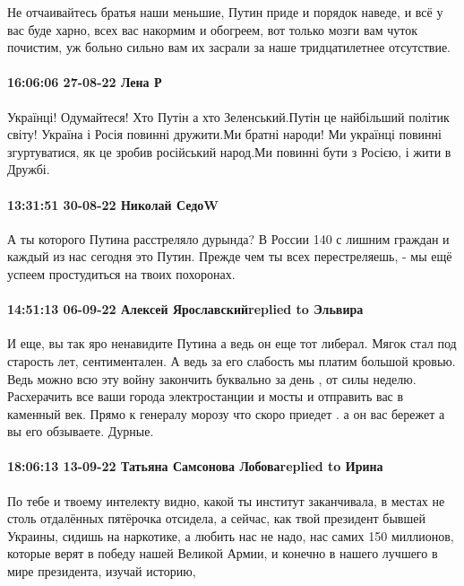 Не отчаивайтесь братья наши меньшие, Путин приде и порядок наведе, и всё у вас
буде харно, всех вас накормим и обогреем, вот только мозги вам чуток почистим,
уж больно сильно вам их засрали за наше тридцатилетнее отсутствие.

\paragraph{16:06:06 27-08-22 Лена Р}

Українці! Одумайтеся! Хто Путін а хто Зеленський.Путін це найбільший політик
світу! Україна і Росія повинні дружити.Ми братні народи! Ми українці повинні
згуртуватися, як це зробив російський народ.Ми повинні бути з Росією, і жити в
Дружбі.

\paragraph{13:31:51 30-08-22 Николай СедоW}

А ты которого Путина расстреляло дурында? В России 140 с лишним граждан и каждый из нас сегодня это Путин. Прежде чем ты всех перестреляешь, - мы ещё успеем простудиться на твоих похоронах.

\paragraph{14:51:13 06-09-22 Алексей Ярославскийreplied to Эльвира}

И еще, вы так яро ненавидите Путина а ведь он еще тот либерал. Мягок стал под
старость лет, сентиментален. А ведь за его слабость мы платим большой кровью.
Ведь можно всю эту войну закончить буквально за день , от силы неделю.
Расхерачить все ваши города электростанции и мосты и отправить вас в каменный
век. Прямо к генералу морозу что скоро приедет . а он вас бережет а вы его
обзываете. Дурные.

\paragraph{18:06:13 13-09-22 Татьяна Самсонова Лобоваreplied to Ирина}

По тебе и твоему интелекту видно, какой ты институт заканчивала, в местах не
столь отдалённых пятёрочка отсидела, а сейчас, как твой президент бывшей
Украины, сидишь на наркотике, а любить нас не надо, нас самих 150 миллионов,
которые верят в победу нашей Великой Армии, и конечно в нашего лучшего в мире
президента, изучай историю,







